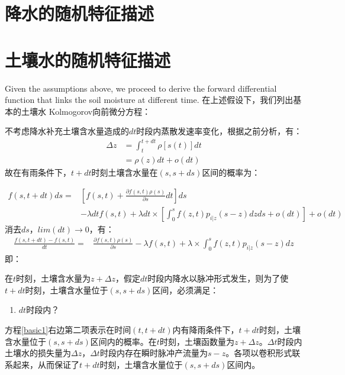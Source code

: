 \section{降水的随机特征描述}
\section{土壤水的随机特征描述}

Given the assumptions above, we  proceed  to derive the forward differential function that links the soil moisture at different time.
在上述假设下，我们列出基本的土壤水  Kolmogorov向前微分方程：
\fi



\iffalse
不考虑降水补充土壤含水量造成的$dt$时段内蒸散发速率变化，根据之前分析，有：
\begin{equation}
\label{deltat}
\begin{split}
\Delta z&=\int_t^{t+dt} \rho[s(t)]dt\\&=\rho(z)dt+o(dt)
\end{split}
\end{equation} 
故在有雨条件下，$t+dt$时刻土壤含水量在$(s,s+ds)$区间的概率为：


\begin{equation}
\begin{split}
f(s,t+dt)ds=&[f(s,t)+\frac{\partial{f(s,t)}\rho(s)}{\partial s}dt]ds\\
&-\lambda dt f(s,t)+\lambda dt \times [\int_{0}^{s} f(z,t)p_{i|z}(s-z)dzds+o(dt)]+o(dt)
\end{split}
\end{equation}
消去$ds$，$lim(dt)\rightarrow0$，有：
\begin{equation}
\begin{split}
\frac{f(s,t+dt)-f(s,t)}{dt}=&\frac{\partial{f(s,t)\rho(s)}}{\partial s}-\lambda  f(s,t)+\lambda \times \int_{0}^{s} f(z,t)p_{i|z}(s-z)dz 
\end{split}
\end{equation} 
即：





在$t$时刻，土壤含水量为$z+\Delta z$，假定$dt$时段内降水以脉冲形式发生，则为了使$t+dt$时刻，土壤含水量位于$(s,s+ds)$区间，必须满足：
\begin{enumerate}
\item $dt$时段内？

\end{enumerate}

方程\ref{basic1}右边第二项表示在时间$(t,t+dt)$内有降雨条件下，$t+dt$时刻，土壤含水量位于$(s,s+ds)$区间内的概率。在$t$时刻，土壤函数量为$z+\Delta z$。$\Delta t$时段内土壤水的损失量为$\Delta z$，$\Delta t$时段内存在瞬时脉冲产流量为$s-z$。各项以卷积形式联系起来，从而保证了$t+dt$时刻，土壤含水量位于$(s,s+ds)$区间内。

